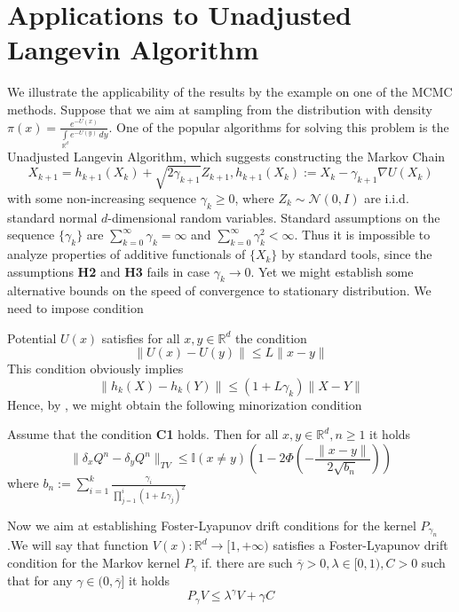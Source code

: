\documentclass[leqno,11pt,a4paper]{article}
\begin{document}
\section{Applications to Unadjusted Langevin Algorithm}\label{sec:ULA}
We illustrate the applicability of the results by the example on one of the MCMC methods. Suppose that we aim at sampling from the distribution with density $\pi(x) = \frac{e^{-U(x)}}{\int\limits_{\mathbb{R}^d} e^{-U(y)}\,dy}$. One of the popular algorithms for solving this problem is the Unadjusted Langevin Algorithm, which suggests constructing the Markov Chain
$$
X_{k+1} = h_{k+1}(X_k) + \sqrt{2\gamma_{k+1}}Z_{k+1}, h_{k+1}(X_k) := X_{k} - \gamma_{k+1}\nabla U(X_{k}) 
$$
with some non-increasing sequence $\gamma_k \geq 0$, where $Z_k \sim \mathcal{N}(0,I)$ are i.i.d. standard normal $d$-dimensional random variables. Standard assumptions on the sequence $\{\gamma_k\}$ are $\sum\limits_{k=0}^{\infty}\gamma_k = \infty$ and $\sum\limits_{k=0}^{\infty}\gamma_k^2 < \infty$. Thus it is impossible to analyze properties of additive functionals of $\{X_k\}$ by standard tools, since the assumptions {\bf H2} and {\bf H3} fails in case $\gamma_k \rightarrow 0$.  Yet we might establish some alternative bounds on the speed of convergence to stationary distribution. We need to impose condition
\par
[{\bf C1}] Potential $U(x)$ satisfies for all $x,y \in \mathbb{R}^d$ the condition
$$
\|U(x) - U(y)\| \leq L\|x-y\|
$$
This condition obviously implies
$$
\|h_{k}(X) - h_k(Y)\| \leq (1+L\gamma_k)\|X-Y\|
$$
Hence, by \cite[Theorem~19]{durmus:moulines:2018}, we might obtain the following minorization condition
\begin{lemma} Assume that the condition {\bf C1} holds. Then for all $x,y \in \mathbb{R}^d, n\geq 1$ it holds
$$
\|\delta_xQ^n - \delta_yQ^n\|_{TV} \leq \mathbb{I}(x \neq y)\left(1 - 2\Phi\left(-\frac{\|x-y\|}{2\sqrt{b_n}}\right)\right)
$$
where $b_n := \sum\nolimits_{i=1}^{k}\frac{\gamma_i}{\prod_{j=1}^{i}(1+L\gamma_j)^2}$
\end{lemma}
Now we aim at establishing Foster-Lyapunov drift conditions for the kernel $P_{\gamma_n}$.We will say that function $V(x): \mathbb{R}^d \rightarrow [1,+\infty)$ satisfies a Foster-Lyapunov drift condition for the Markov kernel $P_\gamma$ if. there are such $\overline{\gamma} > 0, \lambda \in [0,1), C > 0$ such that for any $\gamma \in (0, \overline{\gamma}]$ it holds
\begin{equation}
\label{eq:drift}
P_{\gamma}V \leq \lambda^{\gamma}V + \gamma C
\end{equation}
\end{document}
